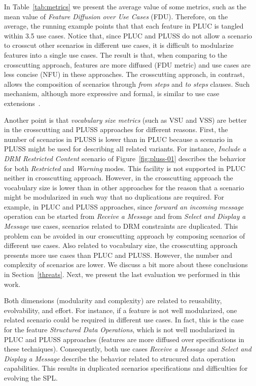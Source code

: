 \documentclass{acm_proc_article-sp}
\begin{document}
In Table~\ref{tab:metrics} we present the average value 
of some metrics, such as the mean value of \emph{Feature Diffusion over Use Cases} (FDU). Therefore, on the average, the running 
example points that that each feature in PLUC is tangled within 3.5 use cases. Notice that, 
since PLUC and PLUSS do not allow a scenario to crosscut other scenarios in different use cases, it is difficult to modularize 
features into a single use cases. The result is that, when comparing to the crosscutting approach, features are more 
diffused (FDU metric) and use cases are less concise (NFU) in these approaches. 
The crosscutting approach, in contrast, allows the composition of scenarios through \emph{from steps} and \emph{to steps} clauses. 
Such mechanism, although more expressive and formal, is similar to use case extensions~\cite{jacobson-oose, jacobson-reuse-book, jacobson-aosd-book}.

Another point is that \emph{vocabulary size metrics} (such as VSU and VSS) are better in the crosscutting and PLUSS approaches for different reasons. First, the number of scenarios in PLUSS is lower than in PLUC because a scenario in PLUSS might be used for describing all related variants. For instance, \emph{Include a DRM Restricted Content} scenario of Figure~\ref{fig:pluss-01} describes the behavior for both \emph{Restricted} and \emph{Warning} modes. This facility is not supported in PLUC neither in crosscutting approach. However, in the crosscutting approach the vocabulary size is lower than in other approaches for the reason that a scenario might be modularized in such way that no duplications are required. For example, in PLUC and PLUSS approaches, since \emph{forward an incoming message} operation can be started from \emph{Receive a Message} and from \emph{Select and Display a Message} use cases, scenarios related to DRM constraints are duplicated. This problem can be avoided in our crosscutting approach by composing scenarios of different use cases.  
Also related to vocabulary size, the crosscutting approach presents more use cases than PLUC and PLUSS. However, 
the number and complexity of scenarios are lower. We discuss a bit more about these conclusions in Section~\ref{threats}. Next, 
we present the last evaluation we performed in this work.

Both dimensions (modularity and complexity) are related to reusability, evolvability, and effort. For instance, if a feature is not well modularized, one related scenario could be required in different use cases. In fact, this is 
the case for the feature \emph{Structured Data Operations}, which is not well modularized in PLUC and PLUSS approaches (features are more diffused over specifications in these techniques). Consequently,  both use cases \emph{Receive a Message} and \emph{Select and Display a Message} describe the behavior related to strucured data operation capabilities. This results in duplicated scenarios specifications and difficulties for evolving the SPL. 
\end{document}
